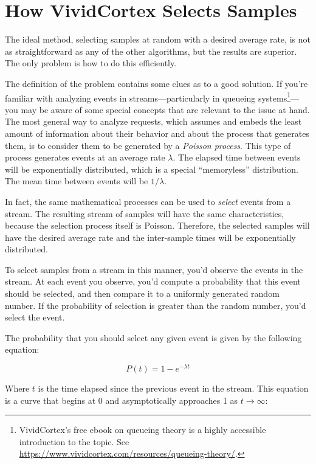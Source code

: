 \documentclass{vivid_layout}
\begin{document}
\section{How VividCortex Selects Samples}

The ideal method, selecting samples at random with a desired average rate, is
not as straightforward as any of the other algorithms, but the results are
superior.  The only problem is how to do this efficiently. 

The definition of the problem contains some clues as to a good solution. If
you're familiar with analyzing events in streams---particularly in queueing
systems\footnote{VividCortex's free ebook on queueing theory is a highly
accessible introduction to the topic. See
\href{https://www.vividcortex.com/resources/queueing-theory/}{https://www.vividcortex.com/resources/queueing-theory/}.}---you may be aware of some special
concepts that are relevant to the issue at hand. The most general way to
analyze requests, which assumes and embeds the least amount of information about
their behavior and about the process that generates them, is to consider them to
be generated by a \emph{Poisson process}. This type of process generates events
at an average rate $\lambda$. The elapsed time between events will be
exponentially distributed, which is a special ``memoryless'' distribution. The
mean time between events will be $1/\lambda$.

In fact, the same mathematical processes can be used to \emph{select} events
from a stream. The resulting stream of samples will have the same
characteristics, because the selection process itself is Poisson. Therefore, the
selected samples will have the desired average rate and the inter-sample times
will be exponentially distributed.

To select samples from a stream in this manner, you'd observe the events in the
stream. At each event you observe, you'd compute a probability that this event
should be selected, and then compare it to a uniformly generated random number.
If the probability of selection is greater than the random number, you'd select
the event.

The probability that you should select any given event is given by the following
equation:

\[
P(t) = 1-e^{-\lambda t}
\]

Where $t$ is the time elapsed since the previous event in the stream. This
equation is a curve that begins at 0 and asymptotically approaches 1 as $t
\to \infty$:
\end{document}
